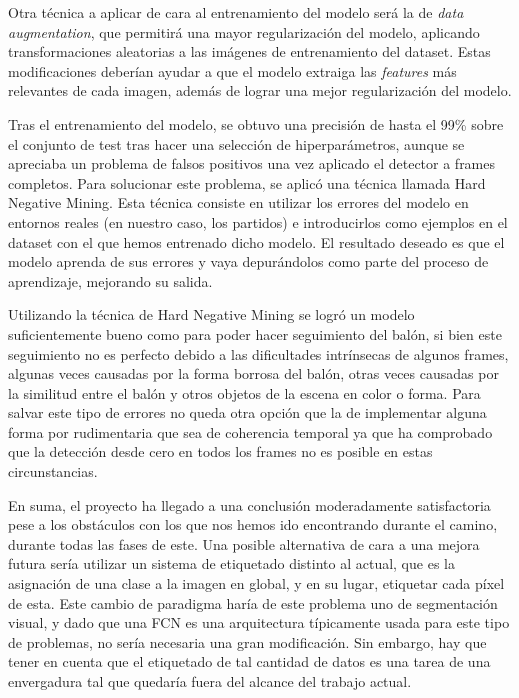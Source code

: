 Otra técnica a aplicar de cara al entrenamiento del modelo será la de \textit{data augmentation}, que permitirá una mayor regularización del modelo, aplicando transformaciones aleatorias a las imágenes de entrenamiento del dataset. Estas modificaciones deberían ayudar a que el modelo extraiga las \textit{features} más relevantes de cada imagen, además de lograr una mejor regularización del modelo.

Tras el entrenamiento del modelo, se obtuvo una precisión de hasta el 99\% sobre el conjunto de test tras hacer una selección de hiperparámetros, aunque se apreciaba un problema de falsos positivos una vez aplicado el detector a frames completos. Para solucionar este problema, se aplicó una técnica llamada Hard Negative Mining. Esta técnica consiste en utilizar los errores del modelo en entornos reales (en nuestro caso, los partidos) e introducirlos como ejemplos en el dataset con el que hemos entrenado dicho modelo. El resultado deseado es que el modelo aprenda de sus errores y vaya depurándolos como parte del proceso de aprendizaje, mejorando su salida.

Utilizando la técnica de Hard Negative Mining se logró un modelo suficientemente bueno como para poder hacer seguimiento del balón, si bien este seguimiento no es perfecto debido a las dificultades intrínsecas de algunos frames, algunas veces causadas por la forma borrosa del balón, otras veces causadas por la similitud entre el balón y otros objetos de la escena en color o forma. Para salvar este tipo de errores no queda otra opción que la de implementar alguna forma por rudimentaria que sea de coherencia temporal ya que ha comprobado que la detección desde cero en todos los frames no es posible en estas circunstancias.

En suma, el proyecto ha llegado a una conclusión moderadamente satisfactoria pese a los obstáculos con los que nos hemos ido encontrando durante el camino, durante todas las fases de este. Una posible alternativa de cara a una mejora futura sería utilizar un sistema de etiquetado distinto al actual, que es la asignación de una clase a la imagen en global, y en su lugar, etiquetar cada píxel de esta. Este cambio de paradigma haría de este problema uno de segmentación visual, y dado que una FCN es una arquitectura típicamente usada para este tipo de problemas, no sería necesaria una gran modificación. Sin embargo, hay que tener en cuenta que el etiquetado de tal cantidad de datos es una tarea de una envergadura tal que quedaría fuera del alcance del trabajo actual.


